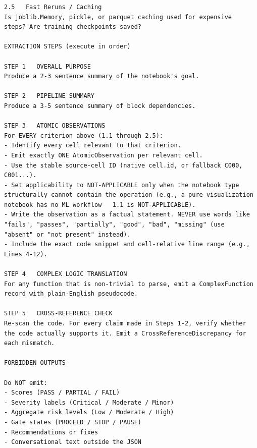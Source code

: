\begin{lstlisting}
2.5   Fast Reruns / Caching
Is joblib.Memory, pickle, or parquet caching used for expensive
steps? Are training checkpoints saved?

EXTRACTION STEPS (execute in order)

STEP 1   OVERALL PURPOSE
Produce a 2-3 sentence summary of the notebook's goal.

STEP 2   PIPELINE SUMMARY
Produce a 3-5 sentence summary of block dependencies.

STEP 3   ATOMIC OBSERVATIONS
For EVERY criterion above (1.1 through 2.5):
- Identify every cell relevant to that criterion.
- Emit exactly ONE AtomicObservation per relevant cell.
- Use the stable source-cell ID (native cell.id, or fallback C000, C001...).
- Set applicability to NOT-APPLICABLE only when the notebook type
structurally cannot contain the operation (e.g., a pure visualization
notebook has no ML workflow   1.1 is NOT-APPLICABLE).
- Write the observation as a factual statement. NEVER use words like
"fails", "passes", "partially", "good", "bad", "missing" (use
"absent" or "not present" instead).
- Include the exact code snippet and cell-relative line range (e.g., Lines 4-12).

STEP 4   COMPLEX LOGIC TRANSLATION
For any function that is non-trivial to parse, emit a ComplexFunction
record with plain-English pseudocode.

STEP 5   CROSS-REFERENCE CHECK
Re-scan the code. For every claim made in Steps 1-2, verify whether
the code actually supports it. Emit a CrossReferenceDiscrepancy for
each mismatch.

FORBIDDEN OUTPUTS

Do NOT emit:
- Scores (PASS / PARTIAL / FAIL)
- Severity labels (Critical / Moderate / Minor)
- Aggregate risk levels (Low / Moderate / High)
- Gate states (PROCEED / STOP / PAUSE)
- Recommendations or fixes
- Conversational text outside the JSON
\end{lstlisting}